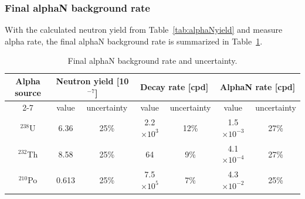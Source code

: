 \subsubsection{Final alphaN background rate}
With the calculated neutron yield from Table~\ref{tab:alphaNyield} and measure alpha rate, the final alphaN background rate is summarized in Table~\ref{tab:alphaN}.


\begin{table}[!htbp]
    \caption{Final alphaN background rate and uncertainty.}
    \label{tab:alphaN}
    \centering
    \footnotesize%
    \setlength{\tabcolsep}{4pt}%
    \renewcommand{\arraystretch}{1.2}%
    \begin{tabular}{c|cc|cc|cc}
        \hline
        \multirow{2}{*}{Alpha source} & \multicolumn{2}{c|}{Neutron yield [10$^{-7}$]} & \multicolumn{2}{c|}{Decay rate [cpd]} & \multicolumn{2}{c}{AlphaN rate [cpd]}  \\ \cline{2-7}
        & value & uncertainty & value & uncertainty & value & uncertainty  \\ \hline
        $^{238}$U & 6.36 & 25\% & 2.2 $\times 10^3$ & 12\% &1.5 $\times 10^{-3}$ & 27\% \\
        $^{232}$Th & 8.58 & 25\% &64 & 9\% & 4.1 $\times 10^{-4}$& 27\% \\ 
        $^{210}$Po & 0.613 & 25\% &7.5 $\times 10^5$ & 7\% & 4.3 $\times 10^{-2}$& 25\% \\
        \hline 
    \end{tabular}
\end{table}

